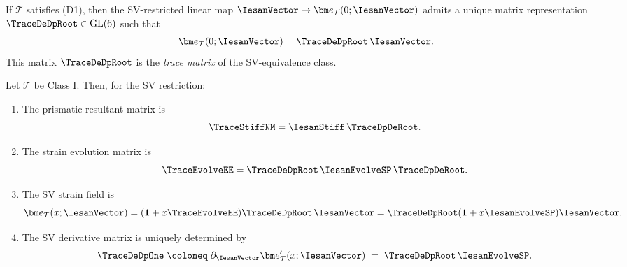 
\begin{lemma}
\label{lem:trace-matrix-exists}
If $\mathcal T$ satisfies (D1), then the SV-restricted linear map
$\IesanVector\mapsto \bm e_{\mathcal T}(0;\IesanVector)$ admits a unique matrix representation
$\TraceDeDpRoot\in\mathrm{GL}(6)$ such that
\[
  \bm e_{\mathcal T}(0;\IesanVector)=\TraceDeDpRoot\,\IesanVector.
\]
This matrix $\TraceDeDpRoot$ is the \emph{trace matrix} of the SV-equivalence class.
\end{lemma}

\begin{proposition}
\label{prop:classI-identities}
Let $\mathcal T$ be Class I. Then, for the SV restriction:

\begin{enumerate}[label=(\alph*)]
\item The prismatic resultant matrix is
\[
  \TraceStiffNM = \IesanStiff\,\TraceDpDeRoot.
\]

\item The strain evolution matrix is
\[
  \TraceEvolveEE = \TraceDeDpRoot\,\IesanEvolveSP\,\TraceDpDeRoot.
\]

\item The SV strain field is
\[
  \bm e_{\mathcal T}(x;\IesanVector)=(\mathbf 1+x\TraceEvolveEE)\TraceDeDpRoot\,\IesanVector
  =\TraceDeDpRoot(\mathbf 1+x\IesanEvolveSP)\IesanVector.
\]

\item The SV derivative matrix is uniquely determined by
\[
  \TraceDeDpOne \;\coloneq\; \partial_{\IesanVector}\bm e_{\mathcal T}'(x;\IesanVector)
  \;=\;\TraceDeDpRoot\,\IesanEvolveSP.
\]
\end{enumerate}
\end{proposition}

